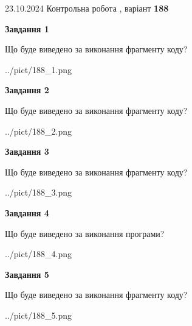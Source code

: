 \documentclass[12pt, ukrainian]{article}
\begin{document}
{\Large{23.10.2024 Контрольна робота , варіант  \No \textbf { 188 }\par}}
{
\begin {large}
{\begin {center}\textbf{Завдання 1}\end {center}}

Що буде виведено за виконання фрагменту коду?\par
\begin{center}
	{../pict/188_1.png}
\end{center}
\newpage

{\begin {center}\textbf{Завдання 2}\end {center}}

Що буде виведено за виконання фрагменту коду?\par
\begin{center}
	{../pict/188_2.png}
\end{center}
\newpage

{\begin {center}\textbf{Завдання 3}\end {center}}

Що буде виведено за виконання фрагменту коду?\par
\begin{center}
	{../pict/188_3.png}
\end{center}
\newpage

{\begin {center}\textbf{Завдання 4}\end {center}}

Що буде виведено за виконання програми?\par
\begin{center}
	{../pict/188_4.png}
\end{center}
\newpage

{\begin {center}\textbf{Завдання 5}\end {center}}

Що буде виведено за виконання фрагменту коду?\par
\begin{center}
	{../pict/188_5.png}
\end{center}
\newpage


\end{large}}
\end{document}
